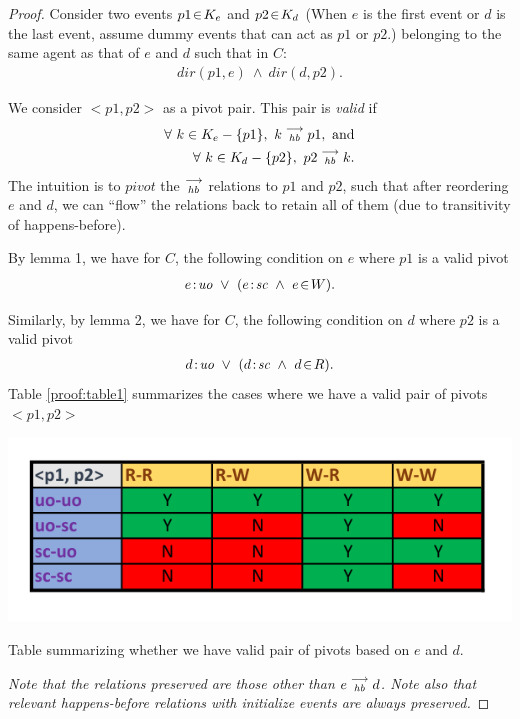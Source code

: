 \begin{proof}
         Consider two events $p1\!\in\!K_e$ and $p2\!\in\!K_d$ (When $e$ is the first event or $d$ is the last event, assume dummy events that can act as $p1$ or $p2$.) belonging to the same agent as that of $e$ and $d$ such that in $C$:
        \begin{align*}
            dir(p1,e)\ \wedge\ dir(d,p2).
        \end{align*}
        
        We consider $<p1,p2>$ as a pivot pair. This pair is  \textit{valid} if 
        \begin{align*}
            \forall \ k \in K_e - \{p1\}, \ \reln{k}{hb}{p1},\ \textrm{and} \\
            \forall \ k \in K_d - \{p2\}, \ \reln{p2}{hb}{k}.
        \end{align*}
        The intuition is to $pivot$ the $\stackrel{\longrightarrow}{_{hb}}$ relations to $p1$ and $p2$, such that after reordering $e$ and $d$, we can ``flow'' the relations back to retain all of them (due to transitivity of happens-before).
        
        By lemma 1, we have for $C$, the following condition on $e$ where $p1$ is a valid pivot
        \begin{align*}
            e\!:\!\textit{uo}\ \vee\ (e\!:\!\textit{sc}\ \wedge\ e\!\in\!W).
        \end{align*}
        
        Similarly, by lemma 2, we have for $C$, the following condition on $d$ where $p2$ is a valid pivot
        \begin{align*}
            d\!:\!\textit{uo}\ \vee\ (d\!:\!\textit{sc}\ \wedge\ d\!\in\!R).
        \end{align*}
        Table \ref{proof:table1} summarizes the cases where we have a valid pair of pivots $<p1,p2>$
        \begin{table}[H]
            \centering
            \includegraphics[scale=0.7]{Table1_Final.pdf}
            \caption{Table summarizing whether we have valid pair of pivots based on  $e$ and $d$.}
            \label{proof:table1}
        \end{table}
        \emph{Note that the relations preserved are those other than $e\stackrel{\longrightarrow}{_{\textit{hb}}}d$. Note also that relevant happens-before relations with initialize events are always preserved. }
        

\end{proof}
